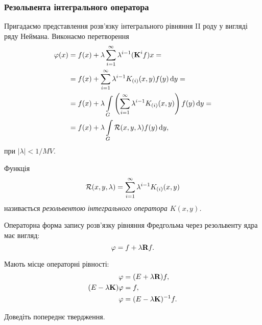 \subsubsection{Резольвента інтегрального оператора}

Пригадаємо представлення розв'язку інтегрального рівняння II роду у вигляді ряду Неймана. Виконаємо перетворення
\begin{equation}
	\begin{aligned}
		\phi(x) &= f(x) + \lambda \Sum_{i = 1}^\infty \lambda^{i - 1} (\bf{K}^i f) x = \\
		&= f(x) + \Sum_{i = 1}^\infty \lambda^{i - 1} K_{(i)} (x, y) f(y) \diff y = \\
		&= f(x) + \lambda \Int_G \left( \Sum_{i = 1}^\infty \lambda^{i - 1} K_{(i)} (x, y) \right) f(y) \diff y = \\
		&= f(x) + \lambda \Int_G \mathcal{R}(x, y, \lambda) f(y) \diff y,
	\end{aligned}
\end{equation}
при $|\lambda| < 1 / MV$.

\begin{definition}
	Функція
	\begin{equation}
		\cal{R}(x, y, \lambda) = \Sum_{i = 1}^\infty \lambda^{i - 1} K_{(i)} (x, y)
	\end{equation}
	називається \it{резольвентою} інтегрального оператора $K(x, y)$.
\end{definition}

\begin{remark}
    Операторна форма запису розв'язку рівняння Фредгольма через резольвенту ядра має вигляд:
    \begin{equation}
    	\phi = f + \lambda \bf{R} f.
    \end{equation}
\end{remark}

\begin{proposition}
	\label{proposition:2.1.17}
	Мають місце операторні рівності:
	\begin{align}
		\phi &= (E + \lambda \bf{R})f, \\
		(E - \lambda \bf{K})\phi &= f, \\
		\phi &= (E - \lambda \bf{K})^{-1}f.
	\end{align}
\end{proposition}

\begin{exercise}
	Доведіть попереднє твердження.
\end{exercise}

